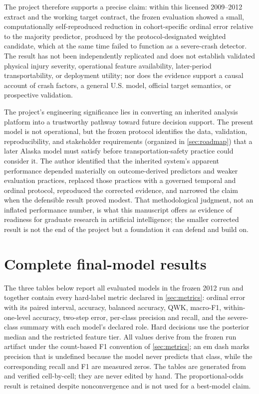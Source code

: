 \documentclass[11pt,letterpaper]{article}
\newcommand{\artifact}[1]{\begingroup\urlstyle{tt}\path{#1}\endgroup}
\begin{document}
The project therefore supports a precise claim: within this licensed 2009--2012 extract and the working target contract, the frozen evaluation showed a small, computationally self-reproduced reduction in cohort-specific ordinal error relative to the majority predictor, produced by the protocol-designated weighted candidate, which at the same time failed to function as a severe-crash detector. The result has not been independently replicated and does not establish validated physical injury severity, operational feature availability, later-period transportability, or deployment utility; nor does the evidence support a causal account of crash factors, a general U.S. model, official target semantics, or prospective validation.

The project's engineering significance lies in converting an inherited analysis platform into a trustworthy pathway toward future decision support. The present model is not operational, but the frozen protocol identifies the data, validation, reproducibility, and stakeholder requirements (organized in \cref{sec:roadmap}) that a later Alaska model must satisfy before transportation-safety practice could consider it. The author identified that the inherited system's apparent performance depended materially on outcome-derived predictors and weaker evaluation practices, replaced those practices with a governed temporal and ordinal protocol, reproduced the corrected evidence, and narrowed the claim when the defensible result proved modest. That methodological judgment, not an inflated performance number, is what this manuscript offers as evidence of readiness for graduate research in artificial intelligence; the smaller corrected result is not the end of the project but a foundation it can defend and build on.

\clearpage



\appendix
{}
\clearpage
\section{Complete final-model results}
\label{app:full-results}
The three tables below report all evaluated models in the frozen 2012 run and together contain every hard-label metric declared in \cref{sec:metrics}: ordinal error with its paired interval, accuracy, balanced accuracy, QWK, macro-F1, within-one-level accuracy, two-step error, per-class precision and recall, and the severe-class summary with each model's declared role. Hard decisions use the posterior median and the restricted feature tier. All values derive from the frozen run artifact under the count-based F1 convention of \cref{sec:metrics}; an em dash marks precision that is undefined because the model never predicts that class, while the corresponding recall and F1 are measured zeros. The tables are generated from \artifact{experiment/final_results.json} and verified cell-by-cell; they are never edited by hand. The proportional-odds result is retained despite nonconvergence and is not used for a best-model claim.
\end{document}
